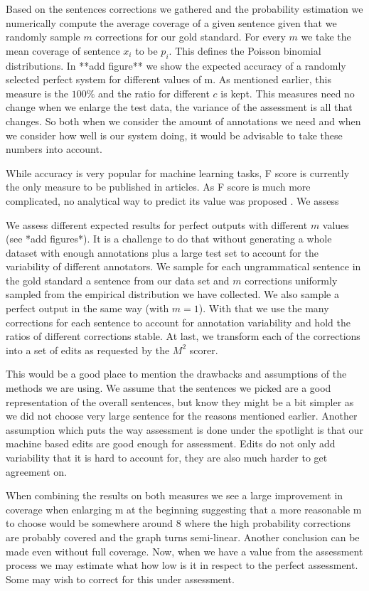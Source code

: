 \documentclass[11pt]{article}
\begin{document}
Based on the sentences corrections we gathered and the probability estimation we numerically compute the average coverage of a given sentence given that we randomly sample $m$ corrections for our gold standard. For every $m$ we take the mean coverage of sentence $x_i$ to be $p_i$. This defines the Poisson binomial distributions. In {*}{*}add figure{*}{*} we show the expected accuracy of a randomly selected perfect system for different values of m. As mentioned earlier, this measure is the $100\%$ and the ratio for different $c$ is kept. This measures need no change when we enlarge the test data, the variance of the assessment is all that changes. So both when we consider the amount of annotations we need and when we consider how well is our system doing, it would be advisable to take these numbers into account.

While accuracy is very popular for machine learning tasks, F score is currently the only measure to be published in articles. As F score is much more complicated, no analytical way to predict its value was proposed \cite{yeh2000more}. We assess 

We assess different expected results for perfect outputs with different $m$ values (see {*}add figures{*}). It is a challenge to do that without generating a whole dataset with enough annotations plus a large test set to account for the variability of different annotators. We sample for each ungrammatical sentence in the gold standard a sentence from our data set and $m$ corrections uniformly sampled from the empirical distribution we have collected. We also sample a perfect output in the same way (with $m=1$). With that we use the many corrections for each sentence to account for annotation variability and hold the ratios of different corrections stable. At last, we transform each of the corrections into a set of edits as requested by the $M^2$ scorer\cite{dahlmeier2012better}.  

This would be a good place to mention the drawbacks and assumptions of the methods we are using. We assume that the sentences we picked are a good representation of the overall sentences, but know they might be a bit simpler as we did not choose very large sentence for the reasons mentioned earlier. Another assumption which puts the way assessment is done under the spotlight is that our machine based edits are good enough for assessment. Edits do not only add variability that it is hard to account for, they are also much harder to get agreement on. 

When combining the results on both measures we see a large improvement in coverage when enlarging m at the beginning suggesting that a more reasonable m to choose would be somewhere around 8 where the high probability corrections are probably covered and the graph turns semi-linear.
 Another conclusion can be made even without full coverage. Now, when we have a value from the assessment process we may estimate what how low is it in respect to the perfect assessment. Some may wish to correct for this under assessment.
\end{document}
